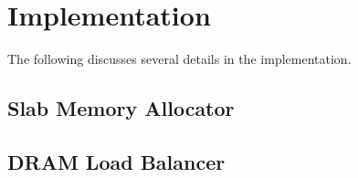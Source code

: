 \section{Implementation}
\label{kvdirect:sec:implementation}



%

The following discusses several details in the implementation.



\subsection{Slab Memory Allocator}



\subsection{DRAM Load Balancer}

